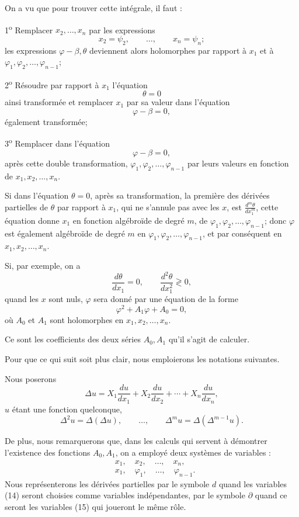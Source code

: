 \documentclass[11pt]{article}
\begin{document}
On a vu que pour trouver cette intégrale, il faut :

1\textsuperscript{o} Remplacer $x_2,\ldots,x_n$ par les expressions
\begin{equation*}\tag{6}
x_2=\psi_2,\qquad \ldots,\qquad x_n=\psi_n;
\end{equation*}
les expressions $\varphi-\beta,\theta$ deviennent alors holomorphes par rapport à $x_1$ et à $\varphi_1,\varphi_2,\ldots,\varphi_{n-1}$;

2\textsuperscript{o} Résoudre par rapport à $x_1$ l’équation
\[
\theta=0
\]
ainsi transformée et remplacer $x_1$ par sa valeur dans l’équation
\[
\varphi-\beta=0,
\]
également transformée;

3\textsuperscript{o} Remplacer dans l’équation
\[
\varphi-\beta=0,
\]
après cette double transformation, $\varphi_1,\varphi_2,\ldots,\varphi_{n-1}$ par leurs valeurs en fonction de $x_1,x_2,\ldots,x_n$.

Si dans l’équation $\theta=0$, après sa transformation, la première des dérivées partielles de $\theta$ par rapport à $x_1$, qui ne s’annule pas avec les $x$, est $\frac{d^m\theta}{dx_1^m}$, cette équation donne $x_1$ en fonction algébroïde de degré $m$, de $\varphi_1,\varphi_2,\ldots,\varphi_{n-1}$; donc $\varphi$ est également algébroïde de degré $m$ en $\varphi_1,\varphi_2,\ldots,\varphi_{n-1}$, et par conséquent en $x_1,x_2,\ldots,x_n$.

Si, par exemple, on a
\[
\frac{d\theta}{dx_1}=0,\qquad \frac{d^2\theta}{dx_1^2}\gtrless0,
\]
quand les $x$ sont nuls, $\varphi$ sera donné par une équation de la forme
\[
\varphi^2+A_1\varphi+A_0=0,
\]
où $A_0$ et $A_1$ sont holomorphes en $x_1,x_2,\ldots,x_n$.

Ce sont les coefficients des deux séries $A_0,A_1$ qu’il s’agit de calculer.

Pour que ce qui suit soit plus clair, nous emploierons les notations suivantes.

Nous poserons
\[
\Delta u=X_1\frac{du}{dx_1}+X_2\frac{du}{dx_2}+\cdots+X_n\frac{du}{dx_n},
\]
$u$ étant une fonction quelconque,
\[
\Delta^2u=\Delta(\Delta u),\qquad \ldots,\qquad \Delta^m u=\Delta(\Delta^{m-1}u).
\]

De plus, nous remarquerons que, dans les calculs qui servent à démontrer l’existence des fonctions $A_0,A_1$, on a employé deux systèmes de variables :
\begin{align*}
\tag{14}
&x_1,\quad x_2,\quad \ldots,\quad x_n,\\
\tag{15}
&x_1,\quad \varphi_1,\quad \ldots,\quad \varphi_{n-1}.
\end{align*}
Nous représenterons les dérivées partielles par le symbole $d$ quand les variables (14) seront choisies comme variables indépendantes, par le symbole $\partial$ quand ce seront les variables (15) qui joueront le même rôle.
\end{document}
